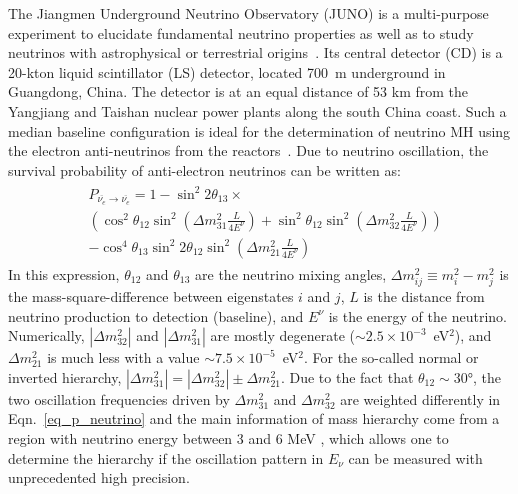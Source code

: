 \documentclass[a4paper,10pt,twoside]{cpc-hepnp}
\begin{document}
\begin{CJK*}{GB}{gbsn}
\begin{multicols}{2}
The Jiangmen Underground Neutrino Observatory (JUNO) is a
multi-purpose experiment to elucidate fundamental neutrino properties
as well as to study neutrinos with astrophysical or terrestrial
origins~\cite{yellow-book}. Its central detector (CD) is a 20-kton
liquid scintillator (LS) detector, located 700~m underground in
Guangdong, China. The detector is at an equal distance of 53 km from
the Yangjiang and Taishan nuclear power plants along the south China
coast. Such a median baseline configuration is ideal for the
determination of neutrino MH using the electron anti-neutrinos from
the reactors~\cite{petcov-original-paper, petcov2, learned,
  zhanliang-original-paper-2008}. Due to neutrino oscillation, the
survival probability of anti-electron neutrinos can be written as:
\begin{eqnarray}
\label{eq_p_neutrino}
\begin{aligned}
  &P_{\overline{\nu_{e}} \rightarrow \overline{\nu_{e}}} = 1-\sin ^{2}2\theta_{13}\times\\
  &\left( \cos^{2}\theta_{12} \sin^{2}(\Delta m_{31}^2\frac{L}{4E^{\nu}}) +\sin ^{2} \theta_{12} \sin ^{2}(\Delta m_{32}^2\frac{L}{4E^{\nu}}) \right) \\
  & -\cos ^{4} \theta_{13} \sin ^{2} 2 \theta_{12} \sin ^{2}(\Delta
  m_{21}^2\frac{L}{4E^{\nu}})
\end{aligned}
\end{eqnarray}
In this expression, $\theta_{12}$ and $\theta_{13}$ are the neutrino
mixing angles, $\Delta m_{ij}^2 \equiv m_i^2 - m_j^2$ is the
mass-square-difference between eigenstates $i$ and $j$, $L$ is the
distance from neutrino production to detection (baseline), and
$E^{\nu}$ is the energy of the neutrino. Numerically, $|\Delta
m_{32}^2|$ and $|\Delta m_{31}^2|$ are mostly degenerate
($\sim2.5\times10^{-3}$~eV$^2$), and $\Delta m_{21}^2$ is much less
with a value $\sim7.5\times10^{-5}$~eV$^2$. For the so-called normal
or inverted hierarchy, $|\Delta m_{31}^2| = |\Delta m_{32}^2| \pm
\Delta m_{21}^2$. Due to the fact that $\theta_{12} \sim \ang{30}$,
the two oscillation frequencies driven by $\Delta m_{31}^2$ and
$\Delta m_{32}^2$ are weighted differently in
Eqn.~\ref{eq_p_neutrino} 
and the main information of mass hierarchy come from a region 
with neutrino energy between 3 and 6 MeV
, which allows one to determine the hierarchy
if the oscillation pattern in $E_{\nu}$ can be measured with
unprecedented high precision.


\end{multicols}
\end{CJK*}
\end{document}
